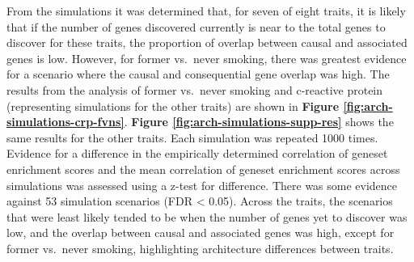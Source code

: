 \documentclass[11pt,oneside]{bristolthesis}
\begin{document}
From the simulations it was determined that, for seven of eight traits, it is likely that if the number of genes discovered currently is near to the total genes to discover for these traits, the proportion of overlap between causal and associated genes is low. However, for former vs.~never smoking, there was greatest evidence for a scenario where the causal and consequential gene overlap was high. The results from the analysis of former vs.~never smoking and c-reactive protein (representing simulations for the other traits) are shown in \textbf{Figure \ref{fig:arch-simulations-crp-fvns}}. \textbf{Figure \ref{fig:arch-simulations-supp-res}} shows the same results for the other traits. Each simulation was repeated 1000 times. Evidence for a difference in the empirically determined correlation of geneset enrichment scores and the mean correlation of geneset enrichment scores across simulations was assessed using a z-test for difference. There was some evidence against 53 simulation scenarios (FDR \textless{} 0.05). Across the traits, the scenarios that were least likely tended to be when the number of genes yet to discover was low, and the overlap between causal and associated genes was high, except for former vs.~never smoking, highlighting architecture differences between traits.
\end{document}
